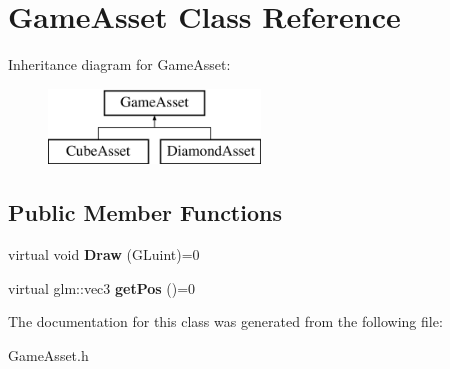 \hypertarget{classGameAsset}{}\section{Game\+Asset Class Reference}
\label{classGameAsset}
Inheritance diagram for Game\+Asset\+:\begin{figure}[H]
\begin{center}
\leavevmode
\includegraphics[height=2.000000cm]{classGameAsset}
\end{center}
\end{figure}
\subsection*{Public Member Functions}
\begin{DoxyCompactItemize}
\item 
virtual void {\bfseries Draw} (G\+Luint)=0\hypertarget{classGameAsset_a961aa51ca0a9961fc584c0b5d5431300}{}\label{classGameAsset_a961aa51ca0a9961fc584c0b5d5431300}

\item 
virtual glm\+::vec3 {\bfseries get\+Pos} ()=0\hypertarget{classGameAsset_a6b3e7c11efd7084e032f23dfd9374672}{}\label{classGameAsset_a6b3e7c11efd7084e032f23dfd9374672}

\end{DoxyCompactItemize}


The documentation for this class was generated from the following file\+:\begin{DoxyCompactItemize}
\item 
Game\+Asset.\+h\end{DoxyCompactItemize}
